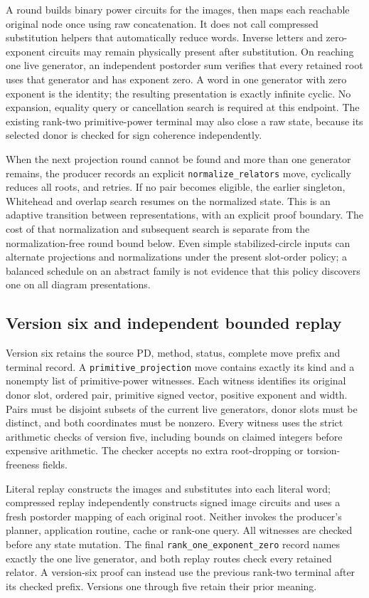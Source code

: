A round builds binary power circuits for the images, then maps each
reachable original node once using raw concatenation. It does not call
compressed substitution helpers that automatically reduce words. Inverse
letters and zero-exponent circuits may remain physically present after
substitution. On reaching one live generator, an independent postorder
sum verifies that every retained root uses that generator and has exponent
zero. A word in one generator with zero exponent is the identity; the
resulting presentation is exactly infinite cyclic. No expansion,
equality query or cancellation search is required at this endpoint.
The existing rank-two primitive-power terminal may also close a raw state,
because its selected donor is checked for sign coherence independently.

When the next projection round cannot be found and more than one generator
remains, the producer records an explicit \texttt{normalize\_relators}
move, cyclically reduces all roots, and retries. If no pair becomes eligible,
the earlier singleton, Whitehead and overlap search resumes on the normalized
state. This is an adaptive transition between representations, with an
explicit proof boundary. The cost of that normalization and subsequent
search is separate from the normalization-free round bound below.
Even simple stabilized-circle inputs can alternate projections and
normalizations under the present slot-order policy; a balanced schedule
on an abstract family is not evidence that this policy discovers one on
all diagram presentations.

\subsection{Version six and independent bounded replay}

Version six retains the source PD, method, status, complete move prefix and
terminal record. A \texttt{primitive\_projection} move contains exactly
its kind and a nonempty list of primitive-power witnesses. Each witness
identifies its original donor slot, ordered pair, primitive signed vector,
positive exponent and width. Pairs must be disjoint subsets of the current
live generators, donor slots must be distinct, and both coordinates must
be nonzero. Every witness uses the strict arithmetic checks of version five,
including bounds on claimed integers before expensive arithmetic.
The checker accepts no extra root-dropping or torsion-freeness fields.

Literal replay constructs the images and substitutes into each literal
word; compressed replay independently constructs signed image circuits
and uses a fresh postorder mapping of each original root. Neither invokes
the producer's planner, application routine, cache or rank-one query.
All witnesses are checked before any state mutation. The final
\texttt{rank\_one\_exponent\_zero} record names exactly the one live
generator, and both replay routes check every retained relator. A version-six
proof can instead use the previous rank-two terminal after its checked
prefix. Versions one through five retain their prior meaning.

